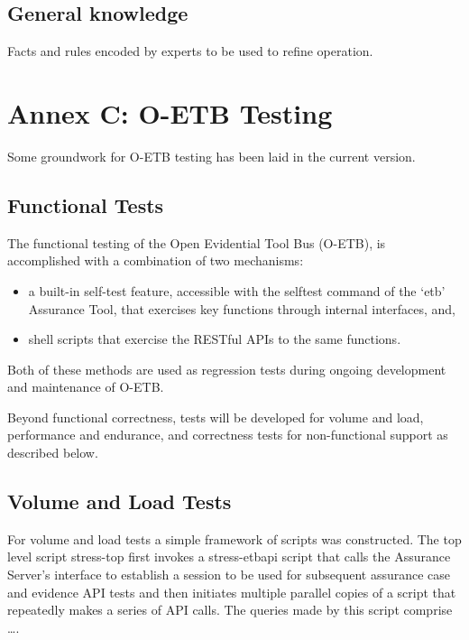 \documentclass[12pt,twoside,a4paper]{article}
\begin{document}
\hypertarget{general-knowledge}{%
\subsection{General knowledge}\label{general-knowledge}}

Facts and rules encoded by experts to be used to refine operation.

\clearpage
\hypertarget{annex-c-o-etb-testing}{%
\section{Annex C: O-ETB Testing}\label{annex-c-o-etb-testing}}

Some groundwork for O-ETB testing has been laid in the current version.

\hypertarget{functional-tests}{%
\subsection{Functional Tests}\label{functional-tests}}

The functional testing of the Open Evidential Tool Bus (O-ETB), is accomplished with a combination of two mechanisms:

\begin{itemize}
\item
  a built-in self-test feature, accessible with the selftest command of the `etb' Assurance Tool, that exercises key functions through internal interfaces, and,
\item
  shell scripts that exercise the RESTful APIs to the same functions.
\end{itemize}

Both of these methods are used as regression tests during ongoing development and maintenance of O-ETB.

Beyond functional correctness, tests will be developed for volume and load, performance and endurance, and correctness tests for non-functional support as described below.

\hypertarget{volume-and-load-tests}{%
\subsection{Volume and Load Tests}\label{volume-and-load-tests}}

For volume and load tests a simple framework of scripts was constructed. The top level script stress-top first invokes a stress-etbapi script that calls the Assurance Server's interface to establish a session to be used for subsequent assurance case and evidence API tests and then initiates multiple parallel copies of a script that repeatedly makes a series of API calls. The queries made by this script comprise \ldots.
\end{document}
